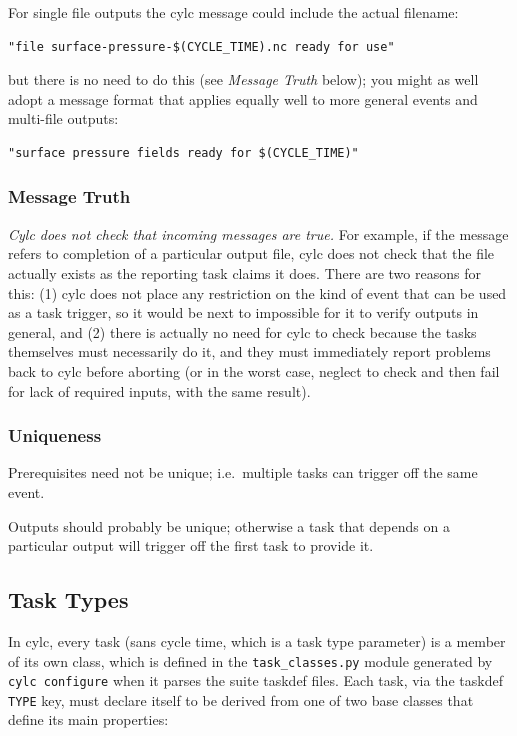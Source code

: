 \documentclass[11pt,a4paper]{article}
\begin{document}
For single file outputs the cylc message could include the actual
filename:
\begin{lstlisting}
"file surface-pressure-$(CYCLE_TIME).nc ready for use"
\end{lstlisting}
but there is no need to do this (see {\em Message Truth} below); you
might as well adopt a message format that applies equally well to
more general events and multi-file outputs:
\begin{lstlisting}
"surface pressure fields ready for $(CYCLE_TIME)"
\end{lstlisting}


\subsubsection{Message Truth}

{\em Cylc does not check that incoming messages are true.}  For example,
if the message refers to completion of a particular output file, cylc
does not check that the file actually exists as the reporting task
claims it does. There are two reasons for this: (1) cylc does not place
any restriction on the kind of event that can be used as a task trigger,
so it would be next to impossible for it to verify outputs in general,
and (2) there is actually no need for cylc to check because the tasks
themselves must necessarily do it, and they must immediately report
problems back to cylc before aborting (or in the worst case, neglect to
check and then fail for lack of required inputs, with the same result).


\subsubsection{Uniqueness}

Prerequisites need not be unique; i.e.\ multiple tasks can trigger off
the same event.

Outputs should probably be unique; otherwise a task that depends on a
particular output will trigger off the first task to provide it.


\subsection{Task Types} 
\label{TaskTypes}

In cylc, every task (sans cycle time, which is a task type parameter) is
a member of its own class, which is defined in the \lstinline=task_classes.py=
module generated by \lstinline=cylc configure= when it parses the suite
taskdef files.  Each task, via the taskdef \lstinline=TYPE= key, must
declare itself to be derived from one of two base classes that define
its main properties:
\end{document}
